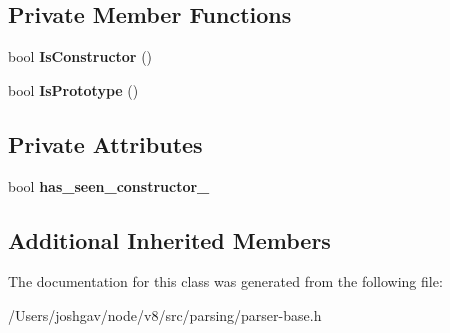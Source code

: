 \subsection*{Private Member Functions}
\begin{DoxyCompactItemize}
\item 
bool {\bfseries Is\+Constructor} ()\hypertarget{classv8_1_1internal_1_1_parser_base_1_1_class_literal_checker_a76332010a91fa6539389217c713d7561}{}\label{classv8_1_1internal_1_1_parser_base_1_1_class_literal_checker_a76332010a91fa6539389217c713d7561}

\item 
bool {\bfseries Is\+Prototype} ()\hypertarget{classv8_1_1internal_1_1_parser_base_1_1_class_literal_checker_a6632d02ff9f558b92e191744cb4d484e}{}\label{classv8_1_1internal_1_1_parser_base_1_1_class_literal_checker_a6632d02ff9f558b92e191744cb4d484e}

\end{DoxyCompactItemize}
\subsection*{Private Attributes}
\begin{DoxyCompactItemize}
\item 
bool {\bfseries has\+\_\+seen\+\_\+constructor\+\_\+}\hypertarget{classv8_1_1internal_1_1_parser_base_1_1_class_literal_checker_a664404deee1d5aeca538d476f0504796}{}\label{classv8_1_1internal_1_1_parser_base_1_1_class_literal_checker_a664404deee1d5aeca538d476f0504796}

\end{DoxyCompactItemize}
\subsection*{Additional Inherited Members}


The documentation for this class was generated from the following file\+:\begin{DoxyCompactItemize}
\item 
/\+Users/joshgav/node/v8/src/parsing/parser-\/base.\+h\end{DoxyCompactItemize}

